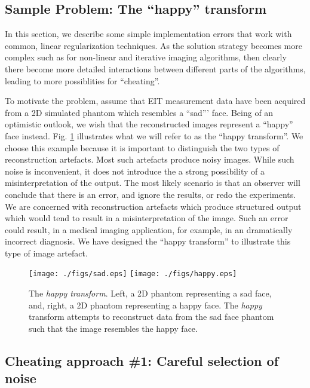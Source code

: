\documentclass[12pt]{iopart}
\begin{document}
\subsection{
Sample Problem: The ``happy'' transform
}

In this section, we describe some simple implementation
errors that work with common, linear
regularization techniques. As the solution
strategy becomes more complex such as for non-linear 
and iterative imaging algorithms, then clearly there
become more detailed interactions between different 
parts of the algorithms, leading to more possiblities
for ``cheating''.

To motivate the problem, assume that EIT measurement
data have been acquired from a 2D simulated phantom which resembles
a ``sad''' face. Being of an optimistic outlook, we wish
that the reconstructed images represent a ``happy'' face
instead. Fig. \ref{fig:happytransform}
illustrates what we will refer to as the ``happy transform''.
We choose this example because it is important to distinguish
the  two types of reconstruction artefacts. Most such artefacts
produce noisy images. While such noise is inconvenient, it does
not introduce the a strong possibility of a misinterpretation of the
output. The most likely scenario is that an observer will conclude
that there is an error, and ignore the results, or redo the experiments.
We are concerned with reconstruction artefacts which
produce structured output which would tend to result in a 
misinterpretation of the image. Such an error could result, in a
medical imaging application, for example, in an dramatically
incorrect diagnosis. We have designed the ``happy transform''
to illustrate this type of image artefact.


%
%
\begin{figure}[th]
\begin{flushright}
\texttt{[image: ./figs/sad.eps]}
\texttt{[image: ./figs/happy.eps]}
\caption{\small The 
{\em happy transform}. Left, a 2D phantom representing
a sad face, and, right, a 2D phantom representing a
happy face. The {\em happy} transform attempts to 
reconstruct data from the sad face phantom such that the
image resembles the happy face.
 }
 \label{fig:happytransform}
\end{flushright}
\end{figure}

\subsection{ Cheating approach \#1:
 Careful selection of noise }
\end{document}
